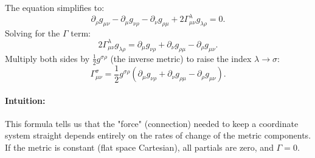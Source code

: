 \documentclass[11pt, a4paper]{report}
\begin{document}
The equation simplifies to:
\begin{equation}
\partial_\rho g_{\mu\nu} - \partial_\mu g_{\nu\rho} - \partial_\nu g_{\rho\mu} + 2 \Gamma^\lambda_{\mu\nu} g_{\lambda\rho} = 0.
\end{equation}
Solving for the \(\Gamma\) term:
\begin{equation}
2 \Gamma^\lambda_{\mu\nu} g_{\lambda\rho} = \partial_\mu g_{\nu\rho} + \partial_\nu g_{\rho\mu} - \partial_\rho g_{\mu\nu}.
\end{equation}
Multiply both sides by \(\frac{1}{2} g^{\sigma\rho}\) (the inverse metric) to raise the index \(\lambda \to \sigma\):
\begin{equation}
\label{eq:christoffel_formula}
\Gamma^\sigma_{\mu\nu} = \frac{1}{2} g^{\sigma\rho} ( \partial_\mu g_{\nu\rho} + \partial_\nu g_{\rho\mu} - \partial_\rho g_{\mu\nu} ).
\end{equation}
\paragraph{Intuition:} This formula tells us that the "force" (connection) needed to keep a coordinate system straight depends entirely on the rates of change of the metric components. If the metric is constant (flat space Cartesian), all partials are zero, and \(\Gamma = 0\).
\end{document}
